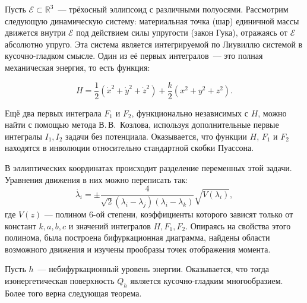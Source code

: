 



\vzmscaption



	Пусть $\mathcal{E}\subset \mathbb{R}^3$~--- трёхосный эллипсоид с различными полуосями. Рассмотрим следующую динамическую систему: материальная точка (шар) единичной массы движется внутри $\mathcal{E}$ под действием силы упругости (закон Гука), отражаясь от $\mathcal{E}$ абсолютно упруго.  Эта система является интегрируемой по Лиувиллю системой в кусочно-гладком смысле. Один из её первых интегралов~--- это  полная механическая энер\-гия, то есть функция:
	
	\[
	H=\dfrac{1}{2}(\dot{x}^2+\dot{y}^2+\dot{z}^2)+\dfrac{k}{2}(x^2+y^2+z^2).
	\]
	
	Ещё два первых интеграла $F_1$ и $F_2$, функционально независимых с $H$, можно найти с помощью метода В.\,В.~Козлова, используя дополнительные первые ин\-те\-гра\-лы $I_1, I_2$ задачи без потенциала. Оказывается, что функции $H$, $F_1$ и $F_2$ находятся в инволюции относительно стандартной скобки Пуассона.
	
	В эллиптических координатах происходит разделение переменных этой задачи. Уравнения движения в них можно переписать так:
	\[
	\dot{\lambda_i}=\pm\dfrac{4}{\sqrt{2}(\lambda_i-\lambda_j)(\lambda_i-\lambda_k)}\sqrt{V(\lambda_i)},	 
	\]
	где $V(z)$ --- полином 6-ой степени, коэффициенты которого зависят только от констант $k,a,b,c$ и значений интегралов $H,F_1,F_2$. Опираясь на свойства этого полинома, была построена бифуркационная диаграмма, найдены области возможного движения и изучены прообразы точек отображения момента. 
	
	Пусть $h$~--- небифуркационный уровень энергии. Оказывается, что тогда изонергетическая поверхность $Q_h$ является кусочно-гладким многообразием. Более того верна следующая теорема.
	
